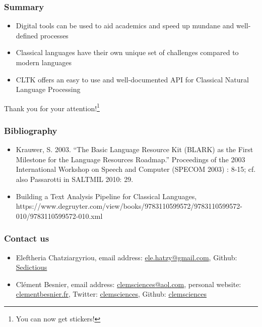 \documentclass{beamer}
\begin{document}
\begin{frame}
\frametitle{Summary}
\begin{itemize}
    \item Digital tools can be used to aid academics and speed up mundane and well-defined processes
    \item Classical languages have their own unique set of challenges compared to modern languages
    \item CLTK offers an easy to use and well-documented API for Classical Natural Language Processing
\end{itemize}
\end{frame}


\begin{frame}
\begin{center}
    Thank you for your attention!\footnote{{You can now get stickers! \footnotesize}}
\end{center}




\end{frame}


\begin{frame}

\frametitle{Bibliography}
\begin{itemize}
    \item \label{paper:krauwer2003} Krauwer, S. 2003. “The Basic Language Resource Kit (BLARK) as the First Milestone for the Language Resources Roadmap.” Proceedings of the 2003 International Workshop on Speech and Computer (SPECOM 2003) : 8-15; cf. also Passarotti in SALTMIL 2010: 29.
    \item \label{paper:burns2019} Building a Text Analysis Pipeline for Classical Languages, https://www.degruyter.com/view/books/9783110599572/9783110599572-010/9783110599572-010.xml
\end{itemize}{}


\end{frame}


\begin{frame}
\frametitle{Contact us}

\begin{itemize}
\item Eleftheria Chatziargyriou, email address: \href{mailto:ele.hatzy@gmail.com}{ele.hatzy@gmail.com}, Github: \href{https://github.com/Sedictious}{Sedictious}

\item Clément Besnier, email address: \href{mailto:clemsciences@aol.com}{clemsciences@aol.com}, personal website: \href{https://www.clementbesnier.fr}{clementbesnier.fr}, Twitter: \href{https://twitter.com/clemsciences}{clemsciences}, Github: \href{https://github.com/clemsciences}{clemsciences}
\end{itemize}

\end{frame}
\end{document}
